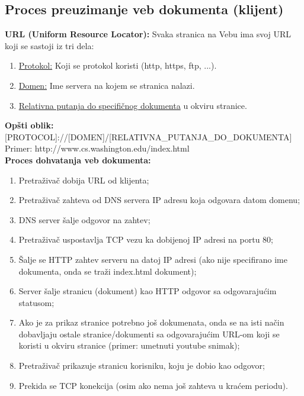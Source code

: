 \documentclass[a4paper]{article}
\begin{document}
    \subsection{Proces preuzimanje veb dokumenta (klijent) }
        \textbf{URL (Uniform Resource Locator):} Svaka stranica na Vebu ima svoj URL koji se 
        sastoji iz tri dela:
        \begin{enumerate}
            \item \underline{Protokol:} Koji se protokol koristi (http, https, ftp, ...).
            \item \underline{Domen:} Ime servera na kojem se stranica nalazi.
            \item \underline{Relativna putanja do specifičnog dokumenta} u okviru stranice.
        \end{enumerate}
        \textbf{Opšti oblik:} [PROTOCOL]://[DOMEN]/[RELATIVNA\_PUTANJA\_DO\_DOKUMENTA]\\
        Primer: http://www.cs.washington.edu/index.html\\

        \noindent \textbf{Proces dohvatanja veb dokumenta:}
        \begin{enumerate}
            \item Pretraživač dobija URL od klijenta;
            \item Pretraživač zahteva od DNS servera IP adresu koja odgovara datom domenu;
            \item DNS server šalje odgovor na zahtev;
            \item Pretraživač uspostavlja TCP vezu ka dobijenoj IP adresi na portu 80;
            \item Šalje se HTTP zahtev serveru na datoj IP adresi (ako nije specifirano ime dokumenta,
                  onda se traži index.html dokument);
            \item Server šalje stranicu (dokument) kao HTTP odgovor sa odgovarajućim statusom;
            \item Ako je za prikaz stranice potrebno još dokumenata, onda se na isti način
                  dobavljaju ostale stranice/dokumenti sa odgovarajućim URL-om koji se koristi 
                  u okviru stranice (primer: umetnuti youtube snimak);
            \item Pretraživač prikazuje stranicu korisniku, koju je dobio kao odgovor;
            \item Prekida se TCP konekcija (osim ako nema još zahteva u kraćem periodu).
        \end{enumerate}
\end{document}
